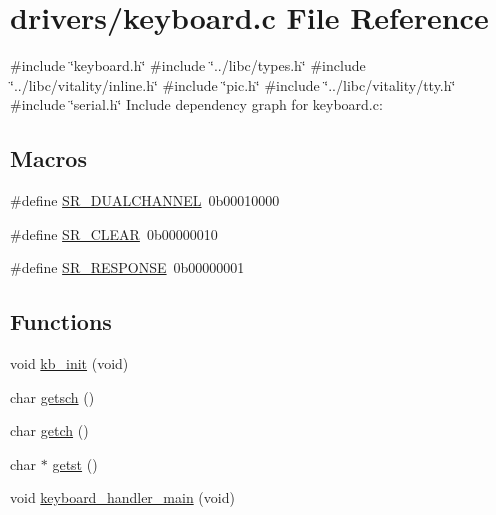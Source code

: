 \hypertarget{a00032}{}\section{drivers/keyboard.c File Reference}
\label{a00032}
{\ttfamily \#include \char`\"{}keyboard.\+h\char`\"{}}\newline
{\ttfamily \#include \char`\"{}../libc/types.\+h\char`\"{}}\newline
{\ttfamily \#include \char`\"{}../libc/vitality/inline.\+h\char`\"{}}\newline
{\ttfamily \#include \char`\"{}pic.\+h\char`\"{}}\newline
{\ttfamily \#include \char`\"{}../libc/vitality/tty.\+h\char`\"{}}\newline
{\ttfamily \#include \char`\"{}serial.\+h\char`\"{}}\newline
Include dependency graph for keyboard.\+c\+:
\subsection*{Macros}
\begin{DoxyCompactItemize}
\item 
\#define \hyperlink{a00032_addafe32b109f94a57ae4bf1a1dca05e0_addafe32b109f94a57ae4bf1a1dca05e0}{S\+R\+\_\+\+D\+U\+A\+L\+C\+H\+A\+N\+N\+EL}~0b00010000
\item 
\#define \hyperlink{a00032_a8aa66e8bc828742fb4819d7cd2df598d_a8aa66e8bc828742fb4819d7cd2df598d}{S\+R\+\_\+\+C\+L\+E\+AR}~0b00000010
\item 
\#define \hyperlink{a00032_ac9efa716f8185bae296975136b510c30_ac9efa716f8185bae296975136b510c30}{S\+R\+\_\+\+R\+E\+S\+P\+O\+N\+SE}~0b00000001
\end{DoxyCompactItemize}
\subsection*{Functions}
\begin{DoxyCompactItemize}
\item 
void \hyperlink{a00032_aabdb223e5290f3b3c07bc82d075b87d7_aabdb223e5290f3b3c07bc82d075b87d7}{kb\+\_\+init} (void)
\item 
char \hyperlink{a00032_aa7ee03b27a489828ce588d0fc023cab3_aa7ee03b27a489828ce588d0fc023cab3}{getsch} ()
\item 
char \hyperlink{a00032_af3facad10e05defa48d45b46eb9ebe7e_af3facad10e05defa48d45b46eb9ebe7e}{getch} ()
\item 
char $\ast$ \hyperlink{a00032_ab88a2e96bbe585e228a5b201435c0240_ab88a2e96bbe585e228a5b201435c0240}{getst} ()
\item 
void \hyperlink{a00032_a1db933be72a0547c4070ba55e6697ba2_a1db933be72a0547c4070ba55e6697ba2}{keyboard\+\_\+handler\+\_\+main} (void)
\end{DoxyCompactItemize}
